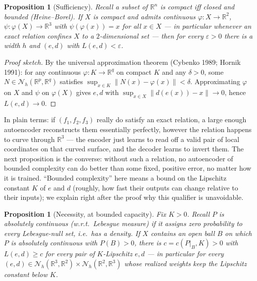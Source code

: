 \documentclass[11pt,reqno]{amsart}
\numberwithin{equation}{section}
\newtheorem{proposition}[theorem]{Proposition}
\theoremstyle{definition}
\theoremstyle{remark}
\begin{document}
\begin{proposition}[Sufficiency]\label{prop:suff}
Recall a subset of $\mathbb R^n$ is \emph{compact} iff closed and bounded
(Heine--Borel). If $X$ is compact and admits continuous
$\varphi:X\to\mathbb R^2$, $\psi:\varphi(X)\to\mathbb R^3$ with
$\psi(\varphi(x))=x$ for all $x\in X$ --- in particular whenever an exact
relation confines $X$ to a $2$-dimensional set --- then for every
$\varepsilon>0$ there is a width $h$ and $(e,d)$ with $L(e,d)<\varepsilon$.
\end{proposition}

\begin{proof}[Proof sketch]
By the universal approximation theorem (Cybenko 1989; Hornik 1991): for any
continuous $\varphi:K\to\mathbb R^q$ on compact $K$ and any $\delta>0$, some
$N\in\mathcal N_h(\mathbb R^p,\mathbb R^q)$ satisfies
$\sup_{x\in K}\|N(x)-\varphi(x)\|<\delta$. Approximating $\varphi$ on $X$ and
$\psi$ on $\varphi(X)$ gives $e,d$ with $\sup_{x\in X}\|d(e(x))-x\|\to0$,
hence $L(e,d)\to0$.
\end{proof}

In plain terms: if $(f_1,f_2,f_3)$ really do satisfy an exact relation, a
large enough autoencoder reconstructs them essentially perfectly, however
the relation happens to curve through $\mathbb R^3$ --- the encoder just
learns to read off a valid pair of local coordinates on that curved surface,
and the decoder learns to invert them. The next proposition is the converse:
without such a relation, no autoencoder of bounded complexity can do better
than some fixed, positive error, no matter how it is trained. ``Bounded
complexity'' here means a bound on the Lipschitz constant $K$ of $e$ and
$d$ (roughly, how fast their outputs can change relative to their inputs);
we explain right after the proof why this qualifier is unavoidable.

\begin{proposition}[Necessity, at bounded capacity]\label{prop:nec}
Fix $K>0$. Recall $P$ is \emph{absolutely continuous} (w.r.t.\ Lebesgue
measure) if it assigns zero probability to every Lebesgue-null set, i.e.\
has a density. If $X$ contains an open ball $B$ on which $P$ is absolutely
continuous with $P(B)>0$, there is $c=c(P|_B,K)>0$ with $L(e,d)\ge c$ for
every pair of $K$-Lipschitz $e,d$ --- in particular for every
$(e,d)\in\mathcal N_h(\mathbb R^3,\mathbb R^2)\times\mathcal
N_h(\mathbb R^2,\mathbb R^3)$ whose realized weights keep the Lipschitz
constant below $K$.
\end{proposition}
\end{document}
